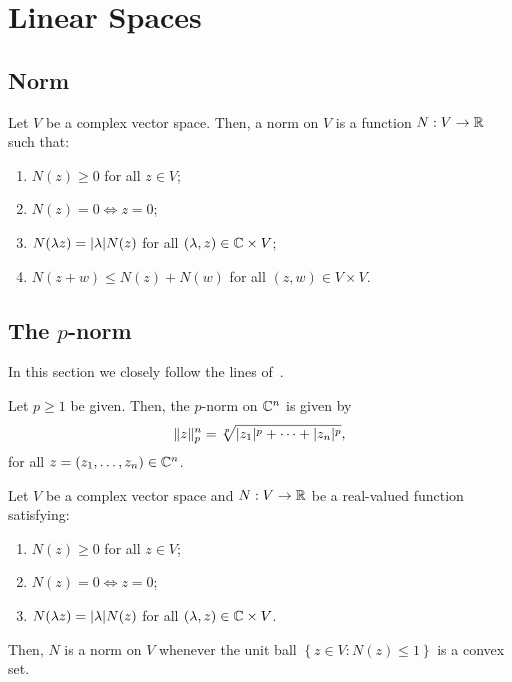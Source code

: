\section{Linear Spaces}\label{sec:linear-spaces}

\subsection{Norm}

\begin{definition}\label{def:normed-linear-spaces}
  Let \(V\) be a complex vector space. Then, a norm on \(V\) is a function
  \(N:V\to\mathbb{R}\) such that:
  \begin{enumerate}
    \item
      \(N(z)\geqslant{0}\) for all \(z\in{V}\);
    \item
      \(N(z)=0\iff{z=0}\);
    \item
      \(N(\lambda{z})=\lvert\lambda\rvert N(z)\) for all
      \((\lambda,z)\in\mathbb{C}\times{V}\);
    \item
      \(N(z+w)\leqslant{N(z)+N(w)}\) for all \((z,w)\in{V\times{V}}\).
  \end{enumerate}
\end{definition}

\subsection{The \(p\)-norm}

In this section we closely follow the lines
of~\cite{yet_another_proof_of_minkowskis_inequality}.

\begin{definition}
  Let \(p\geqslant{1}\) be given. Then, the \(p\)-norm on \(\mathbb{C}^{n}\)
  is given by
  \[
    \norm<n>(p)[z]
    =
    \sqrt[p]{\abs{z_{1}}^{p}+\cdots+\abs{z_{n}}^{p}},
  \]
  for all \(z=(z_{1},\ldots,z_{n})\in\mathbb{C}^{n}\).
\end{definition}

\begin{lemma}\label{lemma:on-norms-and-the-convexity-of-the-unitary-closed-ball}
  Let \(V\) be a complex vector space and \(N:V\to\mathbb{R}\) be a real-valued
  function satisfying:
  \begin{enumerate}
    \item
      \(N(z)\geqslant{0}\) for all \(z\in{V}\);
    \item
      \(N(z)=0\iff{z=0}\);
    \item
      \(N(\lambda{z})=\lvert\lambda\rvert N(z)\) for all
      \((\lambda,z)\in\mathbb{C}\times{V}\).
  \end{enumerate}
  Then, \(N\) is a norm on \(V\) whenever the unit ball
  \(\left\{z\in{V}:N(z)\leqslant{1}\right\}\) is a convex set.
\end{lemma}

